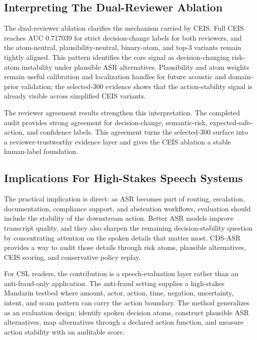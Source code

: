 \subsection{Interpreting The Dual-Reviewer Ablation}

The dual-reviewer ablation clarifies the mechanism carried by CEIS. Full CEIS reaches AUC 0.717039 for strict decision-change labels for both reviewers, and the atom-neutral, plausibility-neutral, binary-atom, and top-3 variants remain tightly aligned. This pattern identifies the core signal as decision-changing risk-atom instability under plausible ASR alternatives. Plausibility and atom weights remain useful calibration and localization handles for future acoustic and domain-prior validation; the selected-300 evidence shows that the action-stability signal is already visible across simplified CEIS variants.

The reviewer agreement results strengthen this interpretation. The completed audit provides strong agreement for decision-change, semantic-risk, expected-safe-action, and confidence labels. This agreement turns the selected-300 surface into a reviewer-trustworthy evidence layer and gives the CEIS ablation a stable human-label foundation.

\subsection{Implications For High-Stakes Speech Systems}

The practical implication is direct: as ASR becomes part of routing, escalation, documentation, compliance support, and abstention workflows, evaluation should include the stability of the downstream action. Better ASR models improve transcript quality, and they also sharpen the remaining decision-stability question by concentrating attention on the spoken details that matter most. CDS-ASR provides a way to audit those details through risk atoms, plausible alternatives, CEIS scoring, and conservative policy replay.

For CSL readers, the contribution is a speech-evaluation layer rather than an anti-fraud-only application. The anti-fraud setting supplies a high-stakes Mandarin testbed where amount, actor, action, time, negation, uncertainty, intent, and scam pattern can carry the action boundary. The method generalizes as an evaluation design: identify spoken decision atoms, construct plausible ASR alternatives, map alternatives through a declared action function, and measure action stability with an auditable score.
